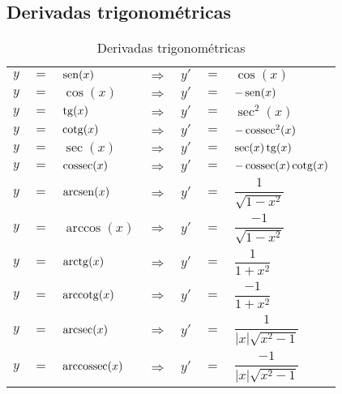 \subsection{Derivadas trigonométricas}
	\begin{table}[H]
		\centering
		\begin{tabular}{|lclclcl|}
			$y$ & $=$ & $\operatorname{sen}(x)$       & $\Rightarrow$ & $y'$ & $=$ & $\cos(x)$                       \\
			$y$ & $=$ & $\cos(x)$       & $\Rightarrow$ & $y'$ & $=$ & $-\operatorname{sen}(x)$                      \\
			$y$ & $=$ & $\operatorname{tg}(x)$        & $\Rightarrow$ & $y'$ & $=$ & $\sec^2(x)$                     \\
			$y$ & $=$ & $\operatorname{cotg}(x)$      & $\Rightarrow$ & $y'$ & $=$ & $-\operatorname{cossec}^2(x)$                 \\
			$y$ & $=$ & $\sec(x)$       & $\Rightarrow$ & $y'$ & $=$ & $\sec(x)\operatorname{tg}(x)$                 \\
			$y$ & $=$ & $\operatorname{cossec}(x)$    & $\Rightarrow$ & $y'$ & $=$ & $-\operatorname{cossec}(x)\operatorname{cotg}(x)$           \\
			$y$ & $=$ & $\operatorname{arcsen}(x)$    & $\Rightarrow$ & $y'$ & $=$ & $\dfrac{1}{\sqrt{1 - x^2}}$     \\
			$y$ & $=$ & $\arccos(x)$    & $\Rightarrow$ & $y'$ & $=$ & $\dfrac{-1}{\sqrt{1 - x^2}}$    \\
			$y$ & $=$ & $\operatorname{arctg}(x)$     & $\Rightarrow$ & $y'$ & $=$ & $\dfrac{1}{1 + x^2}$            \\
			$y$ & $=$ & $\operatorname{arccotg}(x)$   & $\Rightarrow$ & $y'$ & $=$ & $\dfrac{-1}{1 + x^2}$           \\
			$y$ & $=$ & $\operatorname{arcsec}(x)$    & $\Rightarrow$ & $y'$ & $=$ & $\dfrac{1}{|x|\sqrt{x^2 - 1}}$  \\
			$y$ & $=$ & $\operatorname{arccossec}(x)$ & $\Rightarrow$ & $y'$ & $=$ & $\dfrac{-1}{|x|\sqrt{x^2 - 1}}$
		\end{tabular}
		\caption{Derivadas trigonométricas}
		\label{derivadas_trigometricas}
	\end{table}